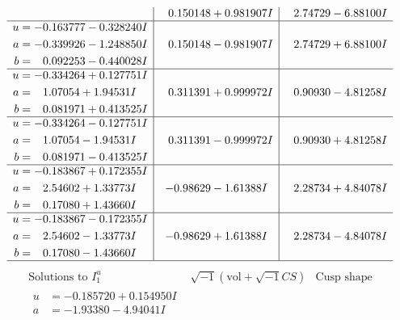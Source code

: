 \documentclass[1p]{elsarticle_modified}
\theoremstyle{definition}
\newcommand{\I}{\sqrt{-1}}
\begin{document}
$$\begin{array}{c|c|c}
 & \phantom{-}0.150148 + 0.981907 I & \phantom{-}2.74729 - 6.88100 I \\ \hline\begin{aligned}
u &= -0.163777 - 0.328240 I \\
a &= -0.339926 - 1.248850 I \\
b &= \phantom{-}0.092253 - 0.440028 I\end{aligned}
 & \phantom{-}0.150148 - 0.981907 I & \phantom{-}2.74729 + 6.88100 I \\ \hline\begin{aligned}
u &= -0.334264 + 0.127751 I \\
a &= \phantom{-}1.07054 + 1.94531 I \\
b &= \phantom{-}0.081971 + 0.413525 I\end{aligned}
 & \phantom{-}0.311391 + 0.999972 I & \phantom{-}0.90930 - 4.81258 I \\ \hline\begin{aligned}
u &= -0.334264 - 0.127751 I \\
a &= \phantom{-}1.07054 - 1.94531 I \\
b &= \phantom{-}0.081971 - 0.413525 I\end{aligned}
 & \phantom{-}0.311391 - 0.999972 I & \phantom{-}0.90930 + 4.81258 I \\ \hline\begin{aligned}
u &= -0.183867 + 0.172355 I \\
a &= \phantom{-}2.54602 + 1.33773 I \\
b &= \phantom{-}0.17080 + 1.43660 I\end{aligned}
 & -0.98629 - 1.61388 I & \phantom{-}2.28734 + 4.84078 I \\ \hline\begin{aligned}
u &= -0.183867 - 0.172355 I \\
a &= \phantom{-}2.54602 - 1.33773 I \\
b &= \phantom{-}0.17080 - 1.43660 I\end{aligned}
 & -0.98629 + 1.61388 I & \phantom{-}2.28734 - 4.84078 I\\
 \hline 
 \end{array}$$\newpage$$\begin{array}{c|c|c}  
\text{Solutions to }I^u_{1}& \I (\text{vol} + \sqrt{-1}CS) & \text{Cusp shape}\\
 \hline 
\begin{aligned}
u &= -0.185720 + 0.154950 I \\
a &= -1.93380 - 4.94041 I \\

\end{aligned}
\end{array}$$
\end{document}
